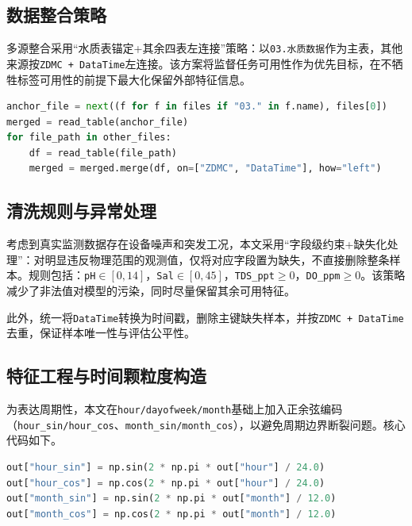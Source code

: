 \subsection{数据整合策略}

多源整合采用“水质表锚定+其余四表左连接”策略：以\texttt{03.水质数据}作为主表，其他来源按\texttt{ZDMC + DataTime}左连接。该方案将监督任务可用性作为优先目标，在不牺牲标签可用性的前提下最大化保留外部特征信息。

\begin{lstlisting}[language=Python,caption={以水质表为锚点的多源左连接},label={lst:merge-anchor}]
anchor_file = next((f for f in files if "03." in f.name), files[0])
merged = read_table(anchor_file)
for file_path in other_files:
    df = read_table(file_path)
    merged = merged.merge(df, on=["ZDMC", "DataTime"], how="left")
\end{lstlisting}

\subsection{清洗规则与异常处理}

考虑到真实监测数据存在设备噪声和突发工况，本文采用“字段级约束+缺失化处理”：对明显违反物理范围的观测值，仅将对应字段置为缺失，不直接删除整条样本。规则包括：\texttt{pH}$\in[0,14]$，\texttt{Sal}$\in[0,45]$，\texttt{TDS\_ppt}$\ge 0$，\texttt{DO\_ppm}$\ge 0$。该策略减少了非法值对模型的污染，同时尽量保留其余可用特征。

此外，统一将\texttt{DataTime}转换为时间戳，删除主键缺失样本，并按\texttt{ZDMC + DataTime}去重，保证样本唯一性与评估公平性。

\subsection{特征工程与时间颗粒度构造}

为表达周期性，本文在\texttt{hour/dayofweek/month}基础上加入正余弦编码（\texttt{hour\_sin/hour\_cos}、\texttt{month\_sin/month\_cos}），以避免周期边界断裂问题。核心代码如下。

\begin{lstlisting}[language=Python,caption={周期时间特征构造},label={lst:time-cyclic}]
out["hour_sin"] = np.sin(2 * np.pi * out["hour"] / 24.0)
out["hour_cos"] = np.cos(2 * np.pi * out["hour"] / 24.0)
out["month_sin"] = np.sin(2 * np.pi * out["month"] / 12.0)
out["month_cos"] = np.cos(2 * np.pi * out["month"] / 12.0)
\end{lstlisting}

